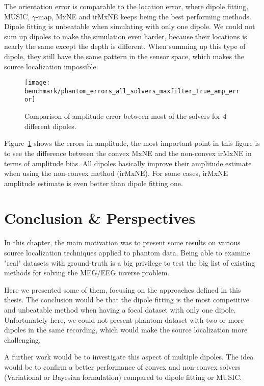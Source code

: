 The orientation error is comparable to the location error, where dipole fitting, MUSIC, $\gamma$-map, MxNE and irMxNE keeps being the best performing methods. Dipole fitting is unbeatable when simulating with only one dipole. We could not sum up dipoles to make the simulation even harder, because their locations is nearly the same except the depth is different. When summing up this type of dipole, they still have the same pattern in the sensor space, which makes the source localization impossible.

\begin{figure}
	\texttt{[image: benchmark/phantom\_errors\_all\_solvers\_maxfilter\_True\_amp\_error]}
	\caption{Comparison of amplitude error between most of the solvers for 4 different dipoles.\label{all_solvers_amp_error}}
\end{figure}

Figure~\ref{all_solvers_amp_error} shows the errors in amplitude, the most important point in this figure is to see the difference between the convex MxNE and the non-convex irMxNE in terms of amplitude bias. All dipoles basically improve their amplitude estimate when using the non-convex method (irMxNE). For some cases, irMxNE amplitude estimate is even better than dipole fitting one.


\section{Conclusion \& Perspectives}
In this chapter, the main motivation was to present some results on various source localization techniques applied to phantom data. Being able to examine "real" datasets with ground-truth is a big privilege to test the big list of existing methods for solving the MEG/EEG inverse problem.

Here we presented some of them, focusing on the approaches defined in this thesis. The conclusion would be that the dipole fitting is the most competitive and unbeatable method when having a focal dataset with only one dipole. Unfortunately here, we could not present phantom dataset with two or more dipoles in the same recording, which would make the source localization more challenging.

A further work would be to investigate this aspect of multiple dipoles. The idea would be to confirm a better performance of convex and non-convex solvers (Variational or Bayesian formulation) compared to dipole fitting or MUSIC.
